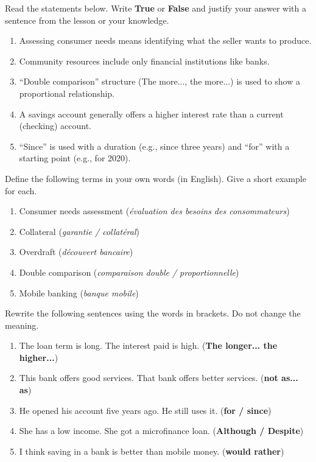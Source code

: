 \documentclass[11pt]{article}
\begin{document}
\begin{exercice}
Read the statements below. Write \textbf{True} or \textbf{False} and justify your answer with a sentence from the lesson or your knowledge.

\begin{enumerate}
    \item Assessing consumer needs means identifying what the seller wants to produce.
    \item Community resources include only financial institutions like banks.
    \item ``Double comparison'' structure (The more..., the more...) is used to show a proportional relationship.
    \item A savings account generally offers a higher interest rate than a current (checking) account.
    \item ``Since'' is used with a duration (e.g., since three years) and ``for'' with a starting point (e.g., for 2020).
\end{enumerate}
\end{exercice}

\begin{exercice}
Define the following terms in your own words (in English). Give a short example for each.

\begin{enumerate}
    \item Consumer needs assessment (\emph{évaluation des besoins des consommateurs})
    \item Collateral (\emph{garantie / collatéral})
    \item Overdraft (\emph{découvert bancaire})
    \item Double comparison (\emph{comparaison double / proportionnelle})
    \item Mobile banking (\emph{banque mobile})
\end{enumerate}
\end{exercice}

\begin{exercice}
Rewrite the following sentences using the words in brackets. Do not change the meaning.

\begin{enumerate}
    \item The loan term is long. The interest paid is high. \quad (\textbf{The longer... the higher...})
    \item This bank offers good services. That bank offers better services. \quad (\textbf{not as... as})
    \item He opened his account five years ago. He still uses it. \quad (\textbf{for / since})
    \item She has a low income. She got a microfinance loan. \quad (\textbf{Although / Despite})
    \item I think saving in a bank is better than mobile money. \quad (\textbf{would rather})
\end{enumerate}
\end{exercice}
\end{document}
